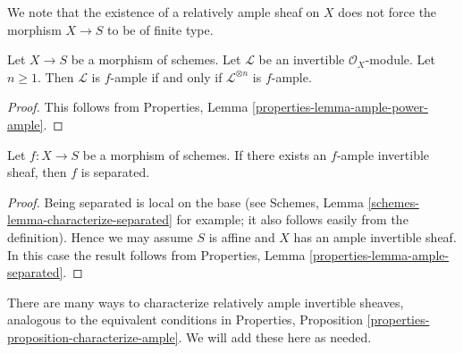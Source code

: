 \noindent
We note that the existence of a relatively ample sheaf on $X$ does not
force the morphism $X \to S$ to be of finite type.

\begin{lemma}
\label{lemma-ample-power-ample}
Let $X \to S$ be a morphism of schemes.
Let $\mathcal{L}$ be an invertible $\mathcal{O}_X$-module.
Let $n \geq 1$. Then $\mathcal{L}$ is $f$-ample if and only if
$\mathcal{L}^{\otimes n}$ is $f$-ample.
\end{lemma}

\begin{proof}
This follows from Properties, Lemma \ref{properties-lemma-ample-power-ample}.
\end{proof}

\begin{lemma}
\label{lemma-relatively-ample-separated}
Let $f : X \to S$ be a morphism of schemes.
If there exists an $f$-ample invertible sheaf, then
$f$ is separated.
\end{lemma}

\begin{proof}
Being separated is local on the base (see
Schemes, Lemma \ref{schemes-lemma-characterize-separated} for example;
it also follows easily from the definition).
Hence we may assume $S$ is affine and $X$
has an ample invertible sheaf. In this case the
result follows from
Properties, Lemma \ref{properties-lemma-ample-separated}.
\end{proof}

\noindent
There are many ways to characterize relatively ample invertible
sheaves, analogous to the equivalent conditions in
Properties, Proposition \ref{properties-proposition-characterize-ample}.
We will add these here as needed.

